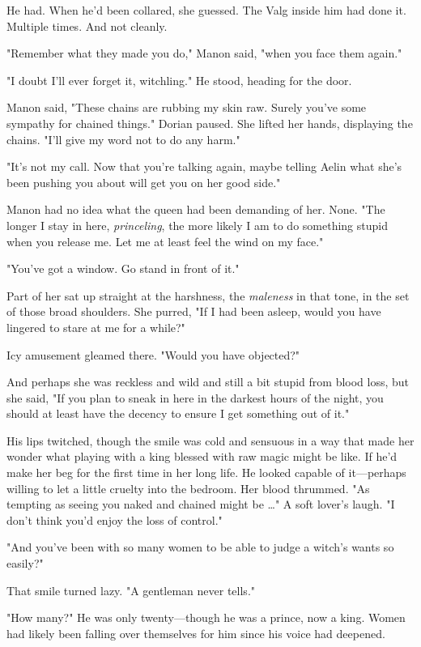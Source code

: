 He had.
When he'd been collared, she guessed.
The Valg inside him had done it.
Multiple times.
And not cleanly.

"Remember what they made you do," Manon said, "when you face them again."

"I doubt I'll ever forget it, witchling."
He stood, heading for the door.

Manon said, "These chains are rubbing my skin raw.
Surely you've some sympathy for chained things."
Dorian paused.
She lifted her hands, displaying the chains.
"I'll give my word not to do any harm."

"It's not my call.
Now that you're talking again, maybe telling Aelin what she's been pushing you about will get you on her good side."

Manon had no idea what the queen had been demanding of her.
None.
"The longer I stay in here, \emph{princeling}, the more likely I am to do something stupid when you release me.
Let me at least feel the wind on my face."

"You've got a window.
Go stand in front of it."

Part of her sat up straight at the harshness, the \emph{maleness} in that tone, in the set of those broad shoulders.
She purred, "If I had been asleep, would you have lingered to stare at me for a while?"

Icy amusement gleamed there.
"Would you have objected?"

And perhaps she was reckless and wild and still a bit stupid from blood loss, but she said, "If you plan to sneak in here in the darkest hours of the night, you should at least have the decency to ensure I get something out of it."

His lips twitched, though the smile was cold and sensuous in a way that made her wonder what playing with a king blessed with raw magic might be like.
If he'd make her beg for the first time in her long life.
He looked capable of it---perhaps willing to let a little cruelty into the bedroom.
Her blood thrummed.
"As tempting as seeing you naked and chained might be \ldots" A soft lover's laugh.
"I don't think you'd enjoy the loss of control."

"And you've been with so many women to be able to judge a witch's wants so easily?"

That smile turned lazy.
"A gentleman never tells."

"How many?"
He was only twenty---though he was a prince, now a king.
Women had likely been falling over themselves for him since his voice had deepened.

